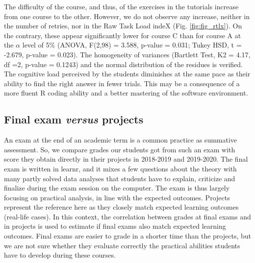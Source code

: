 \documentclass{aims}
\theoremstyle{definition}
\begin{document}
The difficulty of the course, and thus, of the exercises in the
tutorials increase from one course to the other. However, we do not
observe any increase, neither in the number of retries, nor in the Raw
Task Load indeX (Fig. \ref {fig:fig_rtlx}). On the contrary, these
appear significantly lower for course C than for course A at the
\(\alpha\) level of 5\% (ANOVA, F(2,98) = 3.588, p-value = 0.031; Tukey
HSD, t = -2.679, p-value = 0.023). The homogeneity of variances
(Bartlett Test, K2 = 4.17, df =2, p-value = 0.1243) and the normal
distribution of the residues is verified. The cognitive load perceived
by the students diminishes at the same pace as their ability to find the
right answer in fewer trials. This may be a consequence of a more fluent
R coding ability and a better mastering of the software environment.

\hypertarget{final-exam-versus-projects-1}{%
\subsection{\texorpdfstring{Final exam \emph{versus}
projects}{Final exam versus projects}}\label{final-exam-versus-projects-1}}

An exam at the end of an academic term is a common practice as summative
assessment. So, we compare grades our students got from such an exam
with score they obtain directly in their projects in 2018-2019 and
2019-2020. The final exam is written in learnr, and it mixes a few
questions about the theory with many partly solved data analyses that
students have to explain, criticize and finalize during the exam session
on the computer. The exam is thus largely focusing on practical
analysis, in line with the expected outcomes. Projects represent the
reference here as they closely match expected learning outcomes
(real-life cases). In this context, the correlation between grades at
final exams and in projects is used to estimate if final exams also
match expected learning outcomes. Final exams are easier to grade in a
shorter time than the projects, but we are not sure whether they
evaluate correctly the practical abilities students have to develop
during these courses.
\end{document}
